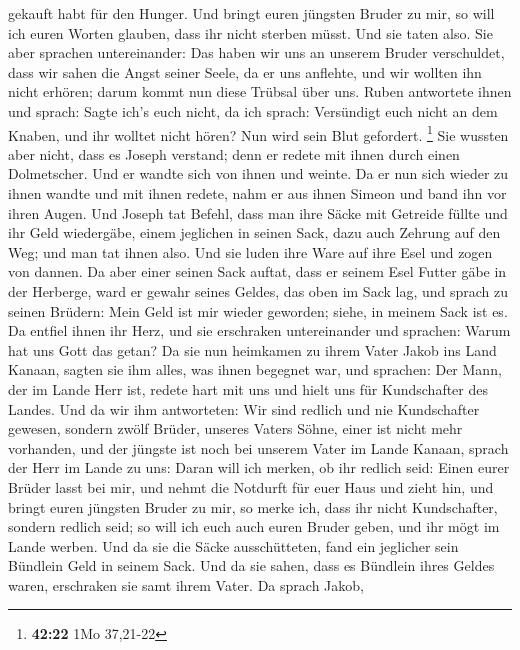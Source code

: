 gekauft habt für den Hunger.  Und bringt euren jüngsten
Bruder zu mir, so will ich euren Worten glauben, dass ihr nicht sterben
müsst. Und sie taten also.  Sie aber sprachen
untereinander: Das haben wir uns an unserem Bruder verschuldet, dass wir
sahen die Angst seiner Seele, da er uns anflehte, und wir wollten ihn
nicht erhören; darum kommt nun diese Trübsal über uns. 
Ruben antwortete ihnen und sprach: Sagte ich's euch nicht, da ich
sprach: Versündigt euch nicht an dem Knaben, und ihr wolltet nicht
hören? Nun wird sein Blut gefordert. \footnote{\textbf{42:22} 1Mo
  37,21-22}  Sie wussten aber nicht, dass es Joseph
verstand; denn er redete mit ihnen durch einen Dolmetscher.
 Und er wandte sich von ihnen und weinte. Da er nun sich
wieder zu ihnen wandte und mit ihnen redete, nahm er aus ihnen Simeon
und band ihn vor ihren Augen.  Und Joseph tat Befehl,
dass man ihre Säcke mit Getreide füllte und ihr Geld wiedergäbe, einem
jeglichen in seinen Sack, dazu auch Zehrung auf den Weg; und man tat
ihnen also.  Und sie luden ihre Ware auf ihre Esel und
zogen von dannen.  Da aber einer seinen Sack auftat, dass
er seinem Esel Futter gäbe in der Herberge, ward er gewahr seines
Geldes, das oben im Sack lag,  und sprach zu seinen
Brüdern: Mein Geld ist mir wieder geworden; siehe, in meinem Sack ist
es. Da entfiel ihnen ihr Herz, und sie erschraken untereinander und
sprachen: Warum hat uns Gott das getan?  Da sie nun
heimkamen zu ihrem Vater Jakob ins Land Kanaan, sagten sie ihm alles,
was ihnen begegnet war, und sprachen:  Der Mann, der im
Lande Herr ist, redete hart mit uns und hielt uns für Kundschafter des
Landes.  Und da wir ihm antworteten: Wir sind redlich und
nie Kundschafter gewesen,  sondern zwölf Brüder, unseres
Vaters Söhne, einer ist nicht mehr vorhanden, und der jüngste ist noch
bei unserem Vater im Lande Kanaan,  sprach der Herr im
Lande zu uns: Daran will ich merken, ob ihr redlich seid: Einen eurer
Brüder lasst bei mir, und nehmt die Notdurft für euer Haus und zieht
hin,  und bringt euren jüngsten Bruder zu mir, so merke
ich, dass ihr nicht Kundschafter, sondern redlich seid; so will ich euch
auch euren Bruder geben, und ihr mögt im Lande werben. 
Und da sie die Säcke ausschütteten, fand ein jeglicher sein Bündlein
Geld in seinem Sack. Und da sie sahen, dass es Bündlein ihres Geldes
waren, erschraken sie samt ihrem Vater.  Da sprach Jakob,
